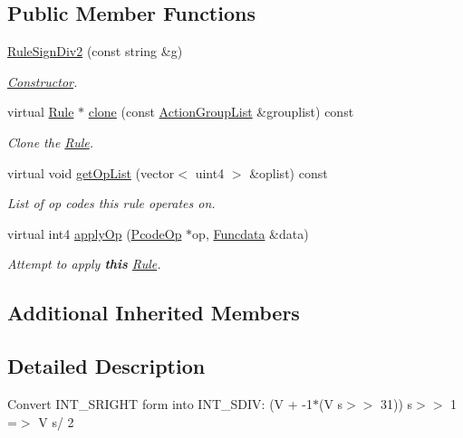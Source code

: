 \subsection*{Public Member Functions}
\begin{DoxyCompactItemize}
\item 
\mbox{\hyperlink{class_rule_sign_div2_ab360d7b2a0e734fc488687cba904fec7}{Rule\+Sign\+Div2}} (const string \&g)
\begin{DoxyCompactList}\small\item\em \mbox{\hyperlink{class_constructor}{Constructor}}. \end{DoxyCompactList}\item 
virtual \mbox{\hyperlink{class_rule}{Rule}} $\ast$ \mbox{\hyperlink{class_rule_sign_div2_a6aa73406ff551ac7714f12d17eb12d39}{clone}} (const \mbox{\hyperlink{class_action_group_list}{Action\+Group\+List}} \&grouplist) const
\begin{DoxyCompactList}\small\item\em Clone the \mbox{\hyperlink{class_rule}{Rule}}. \end{DoxyCompactList}\item 
virtual void \mbox{\hyperlink{class_rule_sign_div2_a7c9196f318303cd2767263e731415730}{get\+Op\+List}} (vector$<$ uint4 $>$ \&oplist) const
\begin{DoxyCompactList}\small\item\em List of op codes this rule operates on. \end{DoxyCompactList}\item 
virtual int4 \mbox{\hyperlink{class_rule_sign_div2_a2c19f27ad4e779fd9fc6a4bce1e16be5}{apply\+Op}} (\mbox{\hyperlink{class_pcode_op}{Pcode\+Op}} $\ast$op, \mbox{\hyperlink{class_funcdata}{Funcdata}} \&data)
\begin{DoxyCompactList}\small\item\em Attempt to apply {\bfseries{this}} \mbox{\hyperlink{class_rule}{Rule}}. \end{DoxyCompactList}\end{DoxyCompactItemize}
\subsection*{Additional Inherited Members}


\subsection{Detailed Description}
Convert I\+N\+T\+\_\+\+S\+R\+I\+G\+HT form into I\+N\+T\+\_\+\+S\+D\+IV\+: {\ttfamily (V + -\/1$\ast$(V s$>$$>$ 31)) s$>$$>$ 1 =$>$ V s/ 2} 

